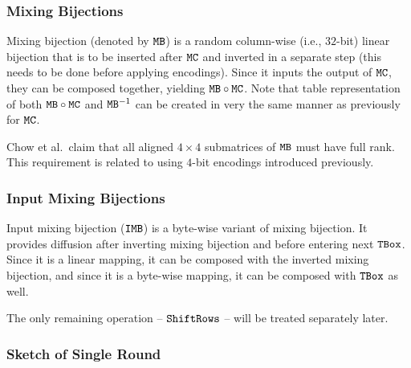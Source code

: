\subsubsection{Mixing Bijections}
	
	Mixing bijection (denoted by $\texttt{MB}$) is a random column-wise (i.e., $32$-bit) linear bijection that is to be inserted after $\texttt{MC}$ and inverted in a separate step (this needs to be done before applying encodings). Since it inputs the output of $\texttt{MC}$, they can be composed together, yielding $\texttt{MB}\circ\texttt{MC}$. Note that table representation of both $\texttt{MB}\circ\texttt{MC}$ and $\texttt{MB}^{-1}$ can be created in very the same manner as previously for $\texttt{MC}$.
	
	\begin{note}
	\label{note:fullrank}
		Chow et al.\ claim that all aligned $4\times4$ submatrices of $\texttt{MB}$ must have full rank. This requirement is related to using $4$-bit encodings introduced previously.
	\end{note}

\subsubsection{Input Mixing Bijections}
	
	Input mixing bijection ($\texttt{IMB}$) is a byte-wise variant of mixing bijection. It provides diffusion after inverting mixing bijection and before entering next $\texttt{TBox}$. Since it is a linear mapping, it can be composed with the inverted mixing bijection, and since it is a byte-wise mapping, it can be composed with $\texttt{TBox}$ as well.
	
	The only remaining operation -- $\texttt{ShiftRows}$ -- will be treated separately later.

\subsubsection{Sketch of Single Round}
	
